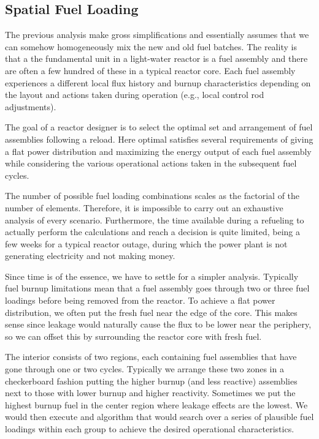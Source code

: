 \subsection{Spatial Fuel Loading}

The previous analysis make gross simplifications and essentially assumes that we can somehow homogeneously mix the new and old fuel batches. The reality is that a the fundamental unit in a light-water reactor is a fuel assembly and there are often a few hundred of these in a typical reactor core. Each fuel assembly experiences a different local flux history and burnup characteristics depending on the layout and actions taken during operation (e.g., local control rod adjustments). 

The goal of a reactor designer is to select the optimal set and arrangement of fuel assemblies following a reload. Here optimal satisfies several requirements of giving a flat power distribution and maximizing the energy output of each fuel assembly while considering the various operational actions taken in the subsequent fuel cycles.

The number of possible fuel loading combinations scales as the factorial of the number of elements. Therefore, it is impossible to carry out an exhaustive analysis of every scenario. Furthermore, the time available during a refueling to actually perform the calculations and reach a decision is quite limited, being a few weeks for a typical reactor outage, during which the power plant is not generating electricity and not making money. 

Since time is of the essence, we have to settle for a simpler analysis. Typically fuel burnup limitations mean that a fuel assembly goes through two or three fuel loadings before being removed from the reactor. To achieve a flat power distribution, we often put the fresh fuel near the edge of the core. This makes sense since leakage would naturally cause the flux to be lower near the periphery, so we can offset this by surrounding the reactor core with fresh fuel. 

The interior consists of two regions, each containing fuel assemblies that have gone through one or two cycles. Typically we arrange these two zones in a checkerboard fashion putting the higher burnup (and less reactive) assemblies next to those with lower burnup and higher reactivity. Sometimes we put the highest burnup fuel in the center region where leakage effects are the lowest. We would then execute and algorithm that would search over a series of plausible fuel loadings within each group to achieve the desired operational characteristics.


